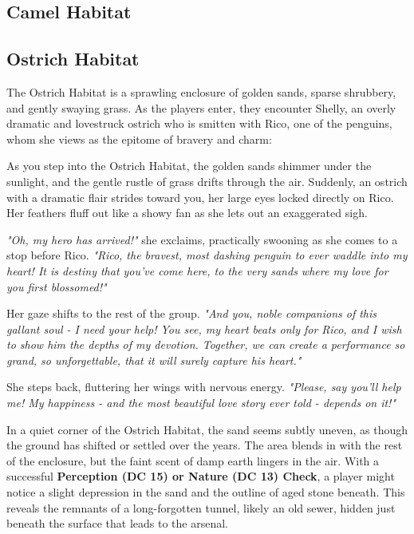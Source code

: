 \subsection*{ Camel Habitat}

\subsection*{ Ostrich Habitat}
{\entryfont The Ostrich Habitat is a sprawling enclosure of golden sands, sparse shrubbery, and gently swaying grass. As the players enter, they encounter Shelly, an overly dramatic and lovestruck ostrich who is smitten with Rico, one of the penguins, whom she views as the epitome of bravery and charm:}

\begin{DndReadAloud}{}
	As you step into the Ostrich Habitat, the golden sands shimmer under the sunlight, and the gentle rustle of grass drifts through the air. Suddenly, an ostrich with a dramatic flair strides toward you, her large eyes locked directly on Rico. Her feathers fluff out like a showy fan as she lets out an exaggerated sigh.

	\textit{"Oh, my hero has arrived!"} she exclaims, practically swooning as she comes to a stop before Rico. \textit{"Rico, the bravest, most dashing penguin to ever waddle into my heart! It is destiny that you've come here, to the very sands where my love for you first blossomed!"}

	Her gaze shifts to the rest of the group. \textit{"And you, noble companions of this gallant soul - I need your help! You see, my heart beats only for Rico, and I wish to show him the depths of my devotion. Together, we can create a performance so grand, so unforgettable, that it will surely capture his heart."}

	She steps back, fluttering her wings with nervous energy. \textit{"Please, say you'll help me! My happiness - and the most beautiful love story ever told - depends on it!"}
\end{DndReadAloud}

{\noindent\entryfont In a quiet corner of the Ostrich Habitat, the sand seems subtly uneven, as though the ground has shifted or settled over the years. The area blends in with the rest of the enclosure, but the faint scent of damp earth lingers in the air. With a successful \textbf{Perception (DC 15) or Nature (DC 13) Check}, a player might notice a slight depression in the sand and the outline of aged stone beneath. This reveals the remnants of a long-forgotten tunnel, likely an old sewer, hidden just beneath the surface that leads to the arsenal.}

